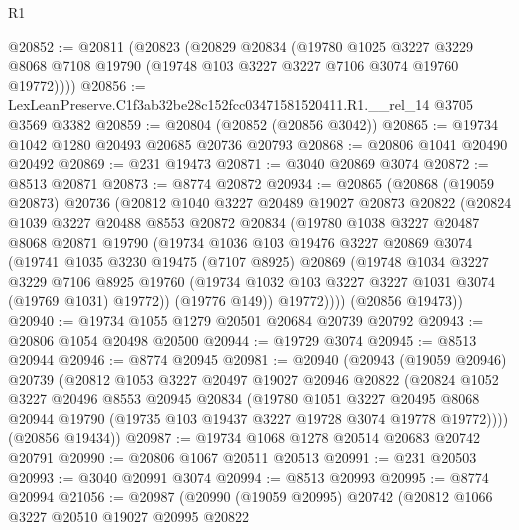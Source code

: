 \begin{lexlean}{R1}
\begin{coremodule}
@20852 := @20811
    (@20823
      (@20829
        @20834
        (@19780
          @1025
          @3227
          @3229
          @8068
          @7108
          @19790
          (@19748 @103 @3227 @3227 @7106 @3074 @19760 @19772))))
@20856 := LexLeanPreserve.C1f3ab32be28c152fcc03471581520411.R1.__rel_14 @3705 @3569 @3382
@20859 := @20804 (@20852 (@20856 @3042))
@20865 := @19734 @1042 @1280 @20493 @20685 @20736 @20793
@20868 := @20806 @1041 @20490 @20492
@20869 := @231 @19473
@20871 := @3040 @20869 @3074
@20872 := @8513 @20871
@20873 := @8774 @20872
@20934 := @20865
    (@20868
      (@19059 @20873)
      @20736
      (@20812
        @1040
        @3227
        @20489
        @19027
        @20873
        @20822
        (@20824
          @1039
          @3227
          @20488
          @8553
          @20872
          @20834
          (@19780
            @1038
            @3227
            @20487
            @8068
            @20871
            @19790
            (@19734
              @1036
              @103
              @19476
              @3227
              @20869
              @3074
              (@19741
                @1035
                @3230
                @19475
                (@7107 @8925)
                @20869
                (@19748
                  @1034
                  @3227
                  @3229
                  @7106
                  @8925
                  @19760
                  (@19734 @1032 @103 @3227 @3227 @1031 @3074 (@19769 @1031) @19772))
                (@19776 @149))
              @19772))))
      (@20856 @19473))
@20940 := @19734 @1055 @1279 @20501 @20684 @20739 @20792
@20943 := @20806 @1054 @20498 @20500
@20944 := @19729 @3074
@20945 := @8513 @20944
@20946 := @8774 @20945
@20981 := @20940
    (@20943
      (@19059 @20946)
      @20739
      (@20812
        @1053
        @3227
        @20497
        @19027
        @20946
        @20822
        (@20824
          @1052
          @3227
          @20496
          @8553
          @20945
          @20834
          (@19780
            @1051
            @3227
            @20495
            @8068
            @20944
            @19790
            (@19735 @103 @19437 @3227 @19728 @3074 @19778 @19772))))
      (@20856 @19434))
@20987 := @19734 @1068 @1278 @20514 @20683 @20742 @20791
@20990 := @20806 @1067 @20511 @20513
@20991 := @231 @20503
@20993 := @3040 @20991 @3074
@20994 := @8513 @20993
@20995 := @8774 @20994
@21056 := @20987
    (@20990
      (@19059 @20995)
      @20742
      (@20812
        @1066
        @3227
        @20510
        @19027
        @20995
        @20822

\end{coremodule}
\end{lexlean}
